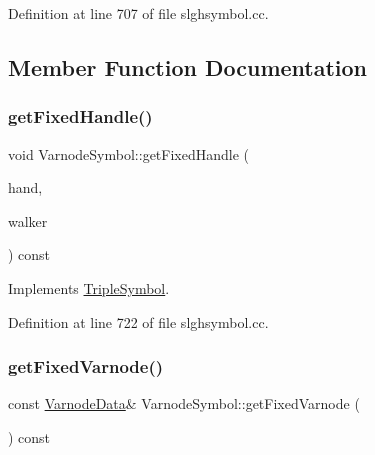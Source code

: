 Definition at line 707 of file slghsymbol.\+cc.



\subsection{Member Function Documentation}
\mbox{\label{class_varnode_symbol_a11a3571821d8d4092798d3cc62d925ee}} 
\subsubsection{\texorpdfstring{getFixedHandle()}{getFixedHandle()}}
{\footnotesize\ttfamily void Varnode\+Symbol\+::get\+Fixed\+Handle (\begin{DoxyParamCaption}\item[{\mbox{\hyperlink{struct_fixed_handle}{Fixed\+Handle}} \&}]{hand,  }\item[{\mbox{\hyperlink{class_parser_walker}{Parser\+Walker}} \&}]{walker }\end{DoxyParamCaption}) const\hspace{0.3cm}{\ttfamily [virtual]}}



Implements \mbox{\hyperlink{class_triple_symbol_aa71f48c79a2bee73e97fdfb8163b4e46}{Triple\+Symbol}}.



Definition at line 722 of file slghsymbol.\+cc.

\mbox{\label{class_varnode_symbol_a4552dee5d466cadd34766d38fd804c8e}} 
\subsubsection{\texorpdfstring{getFixedVarnode()}{getFixedVarnode()}}
{\footnotesize\ttfamily const \mbox{\hyperlink{struct_varnode_data}{Varnode\+Data}}\& Varnode\+Symbol\+::get\+Fixed\+Varnode (\begin{DoxyParamCaption}\item[{void}]{ }\end{DoxyParamCaption}) const\hspace{0.3cm}{\ttfamily [inline]}}



